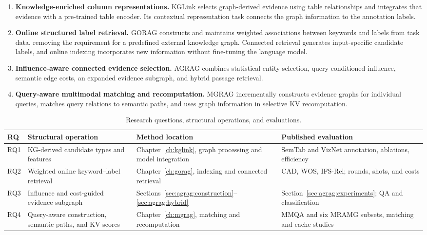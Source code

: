 \begin{enumerate}
\item \textbf{Knowledge-enriched column representations.} KGLink selects graph-derived evidence using table relationships and integrates that evidence with a pre-trained table encoder. Its contextual representation task connects the graph information to the annotation labels.
\item \textbf{Online structured label retrieval.} GORAG constructs and maintains weighted associations between keywords and labels from task data, removing the requirement for a predefined external knowledge graph. Connected retrieval generates input-specific candidate labels, and online indexing incorporates new information without fine-tuning the language model.
\item \textbf{Influence-aware connected evidence selection.} AGRAG combines statistical entity selection, query-conditioned influence, semantic edge costs, an expanded evidence subgraph, and hybrid passage retrieval.
\item \textbf{Query-aware multimodal matching and recomputation.} MGRAG incrementally constructs evidence graphs for individual queries, matches query relations to semantic paths, and uses graph information in selective KV recomputation.
\end{enumerate}

\begin{table}[!htbp]
\centering\small
\caption{Research questions, structural operations, and evaluations.}
\label{tab:introduction:questions}
\begin{tabular}{>{\raggedright\arraybackslash}p{}>{\raggedright\arraybackslash}p{}>{\raggedright\arraybackslash}p{}>{\raggedright\arraybackslash}p{}}
\toprule
RQ & Structural operation & Method location & Published evaluation\\
\midrule
RQ1 & KG-derived candidate types and features & Chapter~\ref{ch:kglink}, graph processing and model integration & SemTab and VizNet annotation, ablations, efficiency\\
RQ2 & Weighted online keyword--label retrieval & Chapter~\ref{ch:gorag}, indexing and connected retrieval & CAD, WOS, IFS-Rel; rounds, shots, and costs\\
RQ3 & Influence and cost-guided evidence subgraph & Sections~\ref{sec:agrag:construction}--\ref{sec:agrag:hybrid} & Section~\ref{sec:agrag:experiments}; QA and classification\\
RQ4 & Query-aware construction, semantic paths, and KV scores & Chapter~\ref{ch:mgrag}, matching and recomputation & MMQA and six MRAMG subsets, matching and cache studies\\
\bottomrule
\end{tabular}
\end{table}

